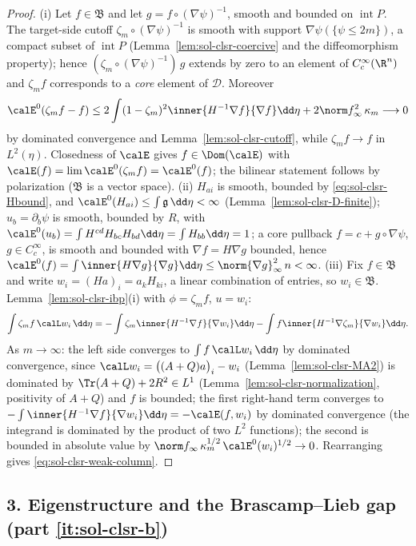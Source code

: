 \documentclass[../main.tex]{subfiles}
\begin{document}
\begin{proof}
(i) Let $f\in\mathfrak B$ and let $g=f\circ(\nabla\psi)^{-1}$, smooth and bounded on
$\operatorname{int}P$.  The target-side cutoff $\zeta_m\circ(\nabla\psi)^{-1}$ is smooth with
support $\nabla\psi(\{\psi\le2m\})$, a compact subset of $\operatorname{int}P$
(Lemma~\ref{lem:sol-clsr-coercive} and the diffeomorphism property); hence
$(\zeta_m\circ(\nabla\psi)^{-1})\,g$ extends by zero to an element of $C_c^\infty(\R^n)$ and
$\zeta_mf$ corresponds to a \emph{core} element of $\mathscr D$.  Moreover
\[
  \calE^0(\zeta_mf-f)
  \le2\int(1-\zeta_m)^2\inner{H^{-1}\nabla f}{\nabla f}\dd\eta
   +2\norm f_\infty^2\,\kappa_m\longrightarrow0
\]
by dominated convergence and Lemma~\ref{lem:sol-clsr-cutoff}, while $\zeta_mf\to f$ in
$L^2(\eta)$.  Closedness of $\calE$ gives $f\in\Dom(\calE)$ with $\calE(f)=\lim\calE^0(\zeta_mf)
=\calE^0(f)$; the bilinear statement follows by polarization ($\mathfrak B$ is a vector
space).
(ii) $H_{ai}$ is smooth, bounded by \eqref{eq:sol-clsr-Hbound}, and
$\calE^0(H_{ai})\le\int\mathfrak g\,\dd\eta<\infty$ (Lemma~\ref{lem:sol-clsr-D-finite});
$u_b=\partial_b\psi$ is smooth, bounded by $R$, with
$\calE^0(u_b)=\int H^{cd}H_{bc}H_{bd}\dd\eta=\int H_{bb}\dd\eta=1$; a core pullback
$f=c+g\circ\nabla\psi$, $g\in C_c^\infty$, is smooth and bounded with
$\nabla f=H\nabla g$ bounded, hence
$\calE^0(f)=\int\inner{H\nabla g}{\nabla g}\dd\eta\le\norm{\nabla g}_\infty^2\,n<\infty$.
(iii) Fix $f\in\mathfrak B$ and write $w_i=(Ha)_i=a_kH_{ki}$, a linear combination of entries,
so $w_i\in\mathfrak B$.  Lemma~\ref{lem:sol-clsr-ibp}(i) with $\phi=\zeta_mf$, $u=w_i$:
\[
  \int\zeta_mf\,\calL w_i\,\dd\eta
  =-\int\zeta_m\inner{H^{-1}\nabla f}{\nabla w_i}\dd\eta
   -\int f\inner{H^{-1}\nabla\zeta_m}{\nabla w_i}\dd\eta .
\]
As $m\to\infty$: the left side converges to $\int f\,\calL w_i\,\dd\eta$ by dominated
convergence, since $\calL w_i=\bigl((A+Q)a\bigr)_i-w_i$
(Lemma~\ref{lem:sol-clsr-MA2}) is dominated by $\Tr(A+Q)+2R^2\in L^1$
(Lemma~\ref{lem:sol-clsr-normalization}, positivity of $A+Q$) and $f$ is bounded; the first
right-hand term converges to $-\int\inner{H^{-1}\nabla f}{\nabla w_i}\dd\eta=-\calE(f,w_i)$ by
dominated convergence (the integrand is dominated by the product of two $L^2$ functions); the
second is bounded in absolute value by
$\norm f_\infty\,\kappa_m^{1/2}\,\calE^0(w_i)^{1/2}\to0$.  Rearranging gives
\eqref{eq:sol-clsr-weak-column}.
\end{proof}

\subsection*{3. Eigenstructure and the Brascamp--Lieb gap (part \ref{it:sol-clsr-b})}
\end{document}
